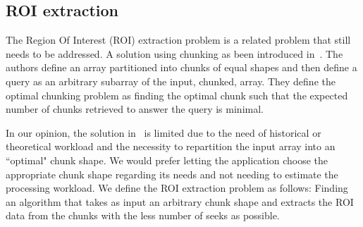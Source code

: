 \documentclass[sigconf, nonacm]{acmart}
\begin{document}



\subsection{ROI extraction}
The Region Of Interest (ROI) extraction problem is a related problem that still
needs to be addressed.
A solution using chunking as been introduced in~\cite{optimal_chuking}.
The authors define an array partitioned into chunks of equal shapes and then
define a query as an arbitrary subarray of the input, chunked, array.
They define the optimal chunking problem as finding the optimal chunk such
that the expected number of chunks retrieved to answer the query is minimal.

In our opinion, the solution in~\cite{optimal_chuking} is limited due to the
need of historical or theoretical workload and the necessity to repartition the
input array into an ``optimal" chunk shape.
We would prefer letting the application choose the appropriate chunk shape
regarding its needs and not needing to estimate the processing workload.
We define the ROI extraction problem as follows: Finding an algorithm that takes
as input an arbitrary chunk shape and extracts the ROI data from the chunks with
the less number of seeks as possible.
\end{document}
